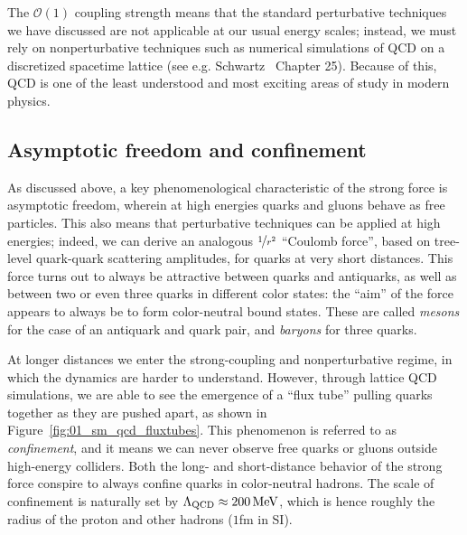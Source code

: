 The $\mathcal O(1)$ coupling strength means that the standard perturbative techniques we have discussed are not applicable at our usual energy scales; instead, we must rely on nonperturbative techniques such as numerical simulations of QCD on a discretized spacetime lattice (see e.g. Schwartz~\cite{Schwartz:2014sze} Chapter 25).
Because of this, QCD is one of the least understood and most exciting areas of study in modern physics.



\subsection{Asymptotic freedom and confinement}
\label{sec:01_sm_qcd_asymptotic}

As discussed above, a key phenomenological characteristic of the strong force is asymptotic freedom, wherein at high energies quarks and gluons behave as free particles.
This also means that perturbative techniques can be applied at high energies; indeed, we can derive an analogous $\nicefrac{1}{r^2}$ ``Coulomb force'', based on tree-level quark-quark scattering amplitudes, for quarks at very short distances.
This force turns out to always be attractive between quarks and antiquarks, as well as between two or even three quarks in different color states: the ``aim'' of the force appears to always be to form color-neutral bound states.
These are called \textit{mesons} for the case of an antiquark and quark pair, and \textit{baryons} for three quarks.

At longer distances we enter the strong-coupling and nonperturbative regime, in which the dynamics are harder to understand.
However, through lattice QCD simulations, we are able to see the emergence of a ``flux tube'' pulling quarks together as they are pushed apart, as shown in Figure~\ref{fig:01_sm_qcd_fluxtubes}.
This phenomenon is referred to as \textit{confinement}, and it means we can never observe free quarks or gluons outside high-energy colliders.
Both the long- and short-distance behavior of the strong force conspire to always confine quarks in color-neutral hadrons.
The scale of confinement is naturally set by $\Lambda_\mathrm{QCD} \approx 200 \,\text{Me\hspace{-.08em}V}$, which is hence roughly the radius of the proton and other hadrons ($1$fm in SI).


